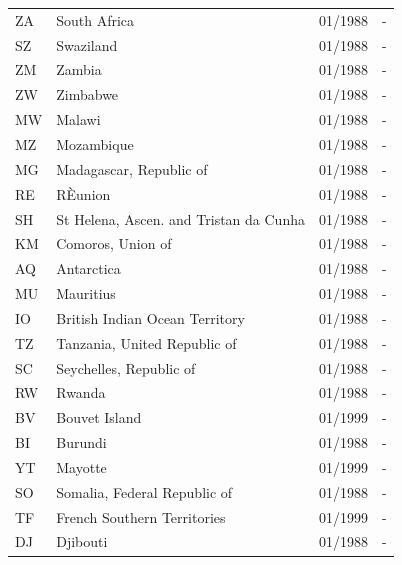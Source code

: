 \begin{small}
\begin{longtable}{p{0.5cm}p{9cm}p{2cm}p{2cm}}
ZA	&	South Africa	&	01/1988	&	-	\\

SZ	&	Swaziland	&	01/1988	&	-	\\

ZM	&	Zambia	&	01/1988	&	-	\\

ZW	&	Zimbabwe	&	01/1988	&	-	\\

MW	&	Malawi	&	01/1988	&	-	\\

MZ	&	Mozambique	&	01/1988	&	-	\\

MG	&	Madagascar, Republic of	&	01/1988	&	-	\\

RE	&	RÈunion	&	01/1988	&	-	\\

SH	&	St Helena, Ascen. and Tristan da Cunha	&	01/1988	&	-	\\

KM	&	Comoros, Union of	&	01/1988	&	-	\\

AQ	&	Antarctica	&	01/1988	&	-	\\

MU	&	Mauritius	&	01/1988	&	-	\\

IO	&	British Indian Ocean Territory	&	01/1988	&	-	\\

TZ	&	Tanzania, United Republic of	&	01/1988	&	-	\\

SC	&	Seychelles, Republic of	&	01/1988	&	-	\\

RW	&	Rwanda	&	01/1988	&	-	\\

BV	&	Bouvet Island	&	01/1999	&	-	\\

BI	&	Burundi	&	01/1988	&	-	\\

YT	&	Mayotte	&	01/1999	&	-	\\

SO	&	Somalia, Federal Republic of	&	01/1988	&	-	\\

TF	&	French Southern Territories	&	01/1999	&	-	\\

DJ	&	Djibouti	&	01/1988	&	-	\\


\end{longtable}
\end{small}
